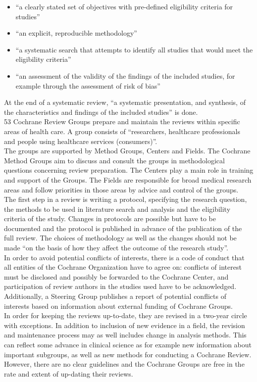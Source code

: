 \documentclass[11pt,a4paper,twoside]{book}\usepackage[]{graphicx}\usepackage[]{color}
\begin{document}
\begin{itemize}
\item``a clearly stated set of objectives with pre-defined eligibility criteria for studies''
\item ``an explicit, reproducible methodology''
\item ``a systematic search that attempts to identify all studies that would meet the eligibility criteria''
\item ``an assessment of the validity of the findings of the included studies, for example through the assessment of risk of bias''
\end{itemize}

At the end of a systematic review, ``a systematic presentation, and synthesis, of the characteristics and findings of the included studies'' is done. \\
53 Cochrane Review Groups prepare and maintain the reviews within specific areas of health care. A group consists of ``researchers, healthcare professionals and people using healthcare services (consumers)''. \\
The groups are supported by Method Groups, Centers and Fields. The Cochrane Method Groups aim to discuss and consult the groups in methodological questions concerning review preparation. The Centers play a main role in training and support of the Groups. The Fields are responsible for broad medical research areas and follow priorities in those areas by advice and control of the groups. \\
The first step in a review is writing a protocol, specifying the research question, the methods to be used in literature search and analysis and the eligibility criteria of the study. Changes in protocols are possible but have to be documented and the protocol is published in advance of the publication of the full review. The choices of methodology as well as the changes should not be made ``on the basis of how they affect the outcome of the research study''. \\
In order to avoid potential conflicts of interests, there is a code of conduct that all entities of the Cochrane Organization have to agree on: conflicts of interest must be disclosed and possibly be forwarded to the Cochrane Center, and participation of review authors in the studies used have to be acknowledged. Additionally, a Steering Group publishes a report of potential conflicts of interests based on information about external funding of Cochrane Groups. \\
In order for keeping the reviews up-to-date, they are revised in a two-year circle with exceptions. In addition to inclusion of new evidence in a field, the revision and maintenance process may as well includes change in analysis methods. This can reflect some advance in clinical science as for example new information about important subgroups, as well as new methods for conducting a Cochrane Review. However, there are no clear guidelines and the Cochrane Groups are free in the rate and extent of up-dating their reviews.
\end{document}
